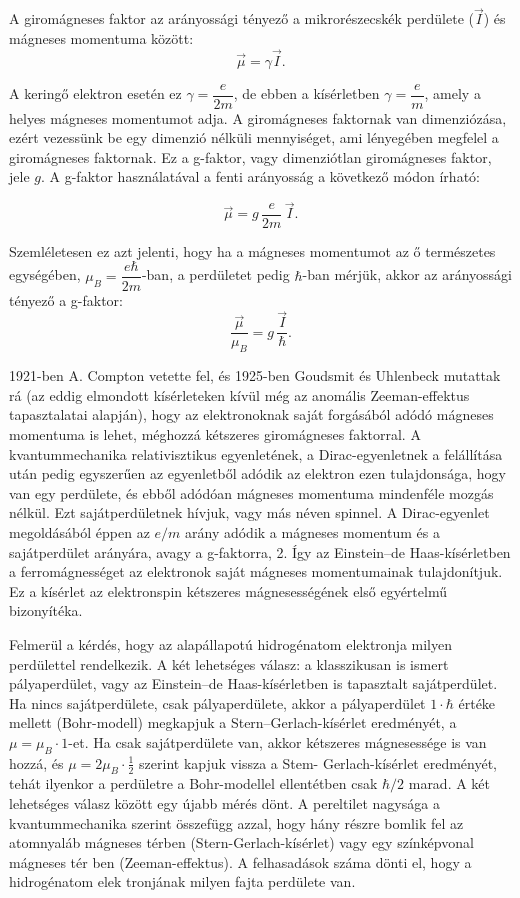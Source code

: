 \documentclass[a4paper,12pt]{article}
\begin{document}
A giromágneses faktor az arányossági tényező a mikrorészecskék perdülete
($\vec{I}$) és mágneses momentuma között:
\begin{equation}
\vec{\mu} = \gamma \vec{I}.
\end{equation}

A keringő elektron esetén ez $\gamma=\dfrac{e}{2m}$, de ebben a
kísérletben $\gamma=\dfrac{e}{m}$, amely a helyes mágneses momentumot adja.
A giromágneses faktornak van dimenziózása, ezért vezessünk be egy
dimenzió nélküli mennyiséget, ami lényegében megfelel a giromágneses faktornak.
Ez a g-faktor, vagy dimenziótlan giromágneses faktor, jele $g$.
A g-faktor használatával a fenti arányosság a következő módon írható:

\begin{equation}
\vec{\mu} = g\,\frac{e}{2m}\,\vec{I}.
\tag{6.3}
\end{equation}

Szemléletesen ez azt jelenti, hogy ha a mágneses momentumot az ő
természetes egységében, $\mu_B=\dfrac{e\hbar}{2m}$-ban, a perdületet
pedig $\hbar$-ban mérjük, akkor az arányossági tényező a g-faktor:
\begin{equation}
\frac{\vec{\mu}}{\mu_B} = g\,\frac{\vec{I}}{\hbar}.
\end{equation}

1921-ben A. Compton vetette fel, és 1925-ben Goudsmit és Uhlenbeck
mutattak rá (az eddig elmondott kísérleteken kívül még az anomális
Zeeman-effektus tapasztalatai alapján), hogy az elektronoknak saját
forgásából adódó mágneses momentuma is lehet, méghozzá kétszeres
giromágneses faktorral.
A kvantummechanika relativisztikus egyenletének, a Dirac-egyenletnek a
felállítása után pedig egyszerűen az egyenletből adódik az elektron ezen
tulajdonsága, hogy van egy perdülete, és ebből adódóan mágneses momentuma
mindenféle mozgás nélkül.
Ezt sajátperdületnek hívjuk, vagy más néven spinnel.
A Dirac-egyenlet megoldásából éppen az $e/m$ arány adódik a mágneses
momentum és a sajátperdület arányára, avagy a g-faktorra, 2.
Így az Einstein–de Haas-kísérletben a ferromágnességet az elektronok
saját mágneses momentumainak tulajdonítjuk.
Ez a kísérlet az elektronspin kétszeres mágnesességének első egyértelmű
bizonyítéka.

Felmerül a kérdés, hogy az alapállapotú hidrogénatom elektronja milyen
perdülettel rendelkezik.
A két lehetséges válasz: a klasszikusan is ismert pályaperdület, vagy az
Einstein–de Haas-kísérletben is tapasztalt sajátperdület.
Ha nincs sajátperdülete, csak pályaperdülete, akkor a pályaperdület
$1 \cdot \hbar$ értéke mellett (Bohr-modell) megkapjuk a Stern–Gerlach-kísérlet
eredményét, a $\mu=\mu_B\cdot 1$-et.
Ha csak sajátperdülete van, akkor kétszeres mágnesessége is van hozzá,
és $\mu=2\mu_B\cdot\frac{1}{2}$ szerint kapjuk vissza a Stem- Gerlach-kísérlet eredményét, tehát ilyenkor a perdületre a Bohr-modellel ellentétben csak $\hbar/2$ marad. A két lehetséges válasz között egy
újabb mérés dönt. A pereltilet nagysága a kvantummechanika szerint összefügg azzal, hogy hány részre bomlik fel az atomnyaláb mágneses térben
(Stern-Gerlach-kísérlet) vagy egy színképvonal mágneses tér ben (Zeeman-effektus). A felhasadások száma dönti el, hogy a hidrogénatom elek tronjának milyen fajta perdülete van.
\end{document}
